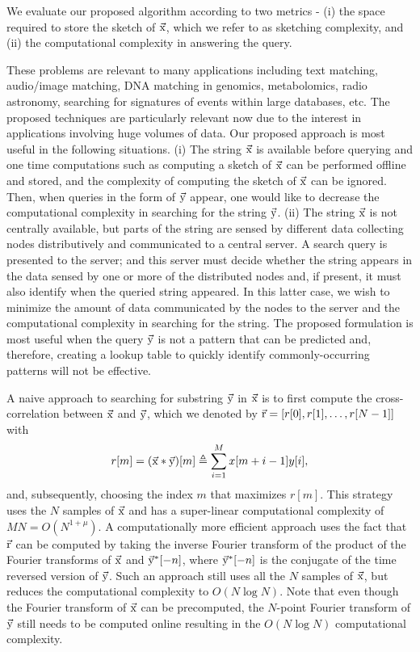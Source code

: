 We evaluate our proposed algorithm according to two metrics - (i) the space required to store the sketch of $\vec{\mathrm{x}}$, which we refer to as sketching complexity, and (ii) the computational complexity in answering the query.

These problems are relevant to many applications including text matching, audio/image matching, DNA matching in genomics, metabolomics, radio astronomy, searching for signatures of events within large databases, etc. The proposed techniques are particularly relevant now due to the interest in applications involving huge volumes of data. Our proposed approach is most useful in the following situations.
(i) The string $\vec{\mathrm{x}}$ is available before querying and one time computations such as computing a sketch of $\vec{\mathrm{x}}$ can be performed offline and stored, and the complexity of computing the sketch of $\vec{\mathrm{x}}$ can be ignored. Then, when queries in the form of $\vec{\mathrm{y}}$ appear, one would like to decrease the computational complexity in searching for the string $\vec{\mathrm{y}}$. (ii) The string $\vec{\mathrm{x}}$ is not centrally available, but parts of the string are sensed by different data collecting nodes distributively and communicated to a central server. A search query is presented to the server; and this server must decide whether the string appears in the data sensed by one or more of the distributed nodes and, if present, it must also identify when the queried string appeared.
In this latter case, we wish to minimize the amount of data communicated by the nodes to the server and the computational complexity in searching for the string.
The proposed formulation is most useful when the query $\vec{\mathrm{y}}$ is not a pattern that can be predicted and, therefore, creating a lookup table to quickly identify commonly-occurring patterns will not be effective.

A naive approach to searching for substring $\vec{\mathrm{y}}$ in $\vec{\mathrm{x}}$ is to first compute the cross-correlation between $\vec{\mathrm{x}}$ and $\vec{\mathrm{y}}$, which we denoted by $\vec{\mathrm{r}}=[r[0], r[1],\ldots, r[N-1]]$ with
\begin{align}
\label{Eqn:DefCrossCorrelation}
r[m]=(\vec{\mathrm{x}}*\vec{\mathrm{y}})[m] \triangleq \sum_{i=1}^{M} x[m+i-1] y[i] ,
\end{align}
and, subsequently,  choosing the index $m$ that maximizes $r[m]$.
This strategy uses the $N$ samples of $\vec{\mathrm{x}}$ and has a super-linear computational complexity of $MN = O(N^{1+\mu})$. A computationally more efficient approach uses the fact that $\vec{\mathrm{r}}$ can be computed by taking the inverse Fourier transform of the product of the Fourier transforms of $\vec{\mathrm{x}}$ and $ \vec{\mathrm{y}}^*[-n]$, where $\vec{\mathrm{y}}^*[-n]$ is the conjugate of the time reversed version of $\vec{\mathrm{y}}$.
Such an approach still uses all the $N$ samples of $\vec{\mathrm{x}}$, but reduces the computational complexity to $O(N \log N)$. Note that even though the Fourier transform of $\vec{\mathrm{x}}$ can be precomputed, the $N$-point Fourier transform of $\vec{\mathrm{y}}$ still needs to be computed online resulting in the $O(N \log N)$ computational complexity.


